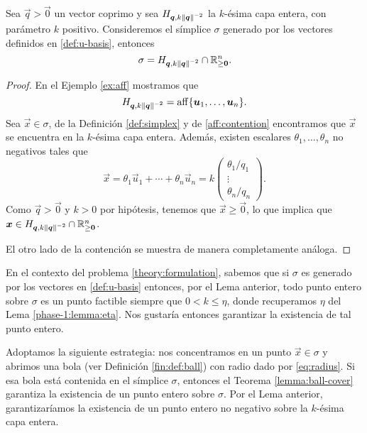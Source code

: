 \begin{lemma}
	\label{lemma:sigmachar1}
	Sea $\vec{q} > \vec{0}$ un vector coprimo y sea $H_{\boldsymbol{q}, k\left\lVert \boldsymbol{q} \right\rVert^{-2}}$ la
	$k$-ésima capa entera, con parámetro $k$ positivo. Consideremos el símplice $\sigma$ generado por
	los vectores definidos en \eqref{def:u-basis}, entonces
	\begin{equation*}
		\sigma = H_{\boldsymbol{q}, k\left\lVert \boldsymbol{q} \right\rVert^{-2}} \cap \mathbb{R}^n_{\geq \boldsymbol{0}}.
	\end{equation*}
\end{lemma}
\begin{proof}
	En el Ejemplo \ref{ex:aff} mostramos que
	\begin{equation*}
		\label{eq:aff-layer}
		H_{\boldsymbol{q}, k\left\lVert \boldsymbol{q} \right\rVert^{-2}} = \operatorname{aff}\lbrace \boldsymbol{u}_1, \ldots, \boldsymbol{u}_n \rbrace.
	\end{equation*}
	Sea $\vec{x} \in \sigma$, de la Definición \ref{def:simplex} y de \eqref{aff:contention} encontramos
	que $\vec{x}$ se encuentra en la $k$-ésima capa entera. Además, existen escalares $\theta_1,
	\ldots, \theta_n$ no negativos tales que
	\begin{equation*}
		\vec{x} = \theta_1\vec{u}_1 + \cdots + \theta_n\vec{u}_n
		= k\begin{pmatrix}
			\theta_1 / q_1 \\
			\vdots \\
			\theta_n / q_n
		\end{pmatrix}.
	\end{equation*}
	Como $\vec{q} > \vec{0}$ y $k > 0$ por hipótesis, tenemos que $\vec{x} \geq \vec{0}$, lo que
	implica que $\boldsymbol{x} \in H_{\boldsymbol{q}, k\left\lVert \boldsymbol{q} \right\rVert^{-2}} \cap \mathbb{R}^n_{\geq \boldsymbol{0}}$.

	El otro lado de la contención se muestra de manera completamente análoga.
\end{proof}

En el contexto del problema \eqref{theory:formulation}, sabemos que si $\sigma$ es generado por los
vectores en \eqref{def:u-basis} entonces, por el Lema anterior, todo punto entero sobre $\sigma$ es
un punto factible siempre que $0 < k \leq \eta$, donde recuperamos $\eta$ del Lema
\ref{phase-1:lemma:eta}. Nos gustaría entonces garantizar la existencia de tal punto entero.

Adoptamos la siguiente estrategia: nos concentramos en un punto $\vec{x} \in \sigma$ y abrimos una
bola (ver Definición \ref{fin:def:ball}) con radio dado por \eqref{eq:radius}. Si esa bola está
contenida en el símplice $\sigma$, entonces el Teorema \ref{lemma:ball-cover} garantiza la
existencia de un punto entero sobre $\sigma$. Por el Lema anterior, garantizaríamos la
existencia de un punto entero no negativo sobre la $k$-ésima capa entera.

